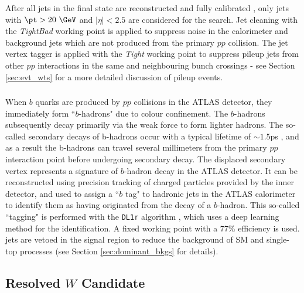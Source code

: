 After all \smallR jets in the final state are reconstructed and fully calibrated \cite{ATLAS-CONF-2015-037}, only jets with \(\pt > 20~\GeV\) and \(|\eta| < 2.5\) are considered for the search. Jet cleaning \cite{ATLAS-CONF-2015-029} with the \emph{TightBad} working point is applied to suppress noise in the calorimeter and background jets which are not produced from the primary \(pp\) collision. The jet vertex tagger \cite{ATLAS-CONF-2014-018} is applied with the \emph{Tight} working point to suppress pileup jets \cite{pileup} from other \(pp\) interactions in the same and neighbouring bunch crossings - see Section \ref{sec:evt_wts} for a more detailed discussion of pileup events. 

\subsubsection{\btag}
\label{sec:btag}

When \(b\) quarks are produced by \(pp\) collisions in the ATLAS detector, they immediately form ``\(b\)-hadrons" due to colour confinement. The \(b\)-hadrons subsequently decay primarily via the weak force \cite{PDG_2018} to form lighter hadrons. The so-called secondary decays of b-hadrons occur with a typical lifetime of \(\sim 1.5\)ps \cite{PDG_2018}, and as a result the b-hadrons can travel several millimeters from the primary \(pp\) interaction point \cite{ATLAS-CONF-2018-006} before undergoing secondary decay. The displaced secondary vertex represents a signature of \(b\)-hadron decay in the ATLAS detector. It can be reconstructed using precision tracking of charged particles provided by the inner detector, and used to assign a ``\(b\) tag" to hadronic jets in the ATLAS calorimeter to identify them as having originated from the decay of a \(b\)-hadron. This so-called ``\bjet tagging" is performed with the \verb|DL1r| algorithm \cite{ATLAS-CONF-2018-006}, which uses a deep learning method for the identification. A fixed working point with a 77\% efficiency is used. \btagged jets are vetoed in the signal region to reduce the background of SM \ttbar and single-top processes (see Section \ref{sec:dominant_bkgs} for details).

\subsection{Resolved \(W\) Candidate}
\label{sec:resolved_w_cand}

